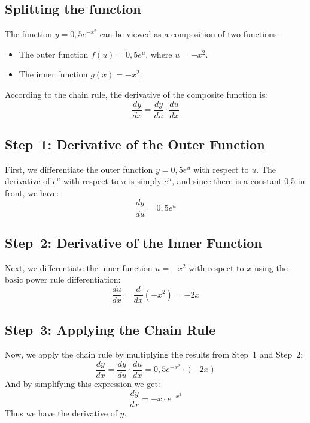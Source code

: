 \documentclass[a4paper,12pt]{article}
\begin{document}
  \subsection{Splitting the function}
  The function $y=0,5e^{-x^2}$ can be viewed as a composition of two functions:
  \begin{itemize}
    \item The outer function $f(u)=0,5e^u$, where $u=-x^2$.
    \item The inner function $g(x)=-x^2$.
  \end{itemize}
  According to the chain rule, the derivative of the composite function is:
  \begin{displaymath}
    \frac{dy}{dx} = \frac{dy}{du} \cdot \frac{du}{dx}
  \end{displaymath}
  \subsection{Step~1: Derivative of the Outer Function}
  First, we differentiate the outer function $y = 0,5e^u$ with respect to $u$. The derivative of $e^u$ with respect to $u$ is simply $e^u$, and since there is a constant 0,5 in front, we have:
  \begin{equation}
    \frac{dy}{du} = 0,5e^u
  \end{equation}
  \subsection{Step~2: Derivative of the Inner Function}
  Next, we differentiate the inner function $u = -x^2$ with respect to $x$ using the basic power rule differentiation:
  \begin{equation}
    \frac{du}{dx} = \frac{d}{dx}\left(-x^2\right) = -2x
  \end{equation}
  \subsection{Step~3: Applying the Chain Rule}
  Now, we apply the chain rule by multiplying the results from Step~1 and Step~2:
  \begin{equation}
    \frac{dy}{dx} = \frac{dy}{du} \cdot \frac{du}{dx} = 0,5e^{-x^2} \cdot \left(-2x\right)
  \end{equation}
  And by simplifying this expression we get:
  \begin{equation}
    \frac{dy}{dx} = -x \cdot e^{-x^2}
  \end{equation}
  Thus we have the derivative of $y$.
\end{document}

